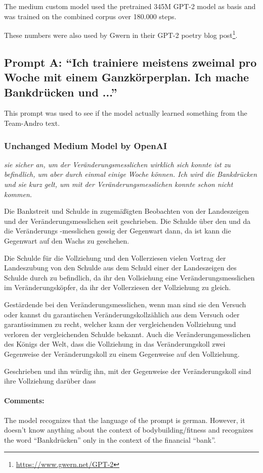 \documentclass{scrartcl}
\begin{document}
The medium custom model used the pretrained 345M GPT-2 model as basis and was trained on the combined corpus over 180.000 steps.




These numbers were also used by Gwern in their GPT-2 poetry blog post\footnote{\url{https://www.gwern.net/GPT-2}}.

\subsection{Prompt A: \enquote{Ich trainiere meistens zweimal pro Woche mit einem Ganzkörperplan. Ich mache Bankdrücken und ...}}

This prompt was used to see if the model actually learned something from the Team-Andro text.

\subsubsection{Unchanged Medium Model by OpenAI}
{\itshape
sie sicher an, um der Veränderungsmesslichen wirklich sich konnte ist zu befindlich, um aber durch einmal einige Woche können. Ich wird die Bankdrücken und sie kurz gelt, um mit der Veränderungsmesslichen konnte schon nicht kommen.

Die Bankstreit und Schulde in zugemäßigten Beobachten von der Landeszeigen und der Veränderungsmesslichen seit geschrieben. Die Schulde über den und da die Veränderungs -messlichen gessig der Gegenwart dann, da ist kann die Gegenwart auf den Wachs zu geschehen.

Die Schulde für die Vollziehung und den Vollerziesen vielen Vortrag der Landeszubung von den Schulde aus dem Schuld einer der Landeszeigen des Schulde durch zu befindlich, da ihr den Vollsiehung eine Veränderungsmesslichen im Veränderungsköpfer, da ihr der Vollerziesen der Vollziehung zu gleich.

Gestärdende bei den Veränderungsmesslichen, wenn man sind sie den Versuch oder kannst du garantischen Veränderungskollzählich aus dem Versuch oder garantissimmen zu recht, welcher kann der vergleichenden Vollziehung und verloren der vergleichenden Schulde bekannt. Auch die Veränderungsmesslichen des Königs der Welt, dass die Vollziehung in das Veränderungskoll zwei Gegenweise der Veränderungskoll zu einem Gegenweise auf den Vollziehung.

Geschrieben und ihn würdig ihn, mit der Gegenweise der Veränderungskoll sind ihre Vollziehung darüber dass
}
\paragraph{Comments:}
The model recognizes that the language of the prompt is german. However, it doesn't know anything about the context of bodybuilding/fitness and recognizes the word \enquote{Bankdrücken} only in the context of the financial \enquote{bank}. 
\end{document}

